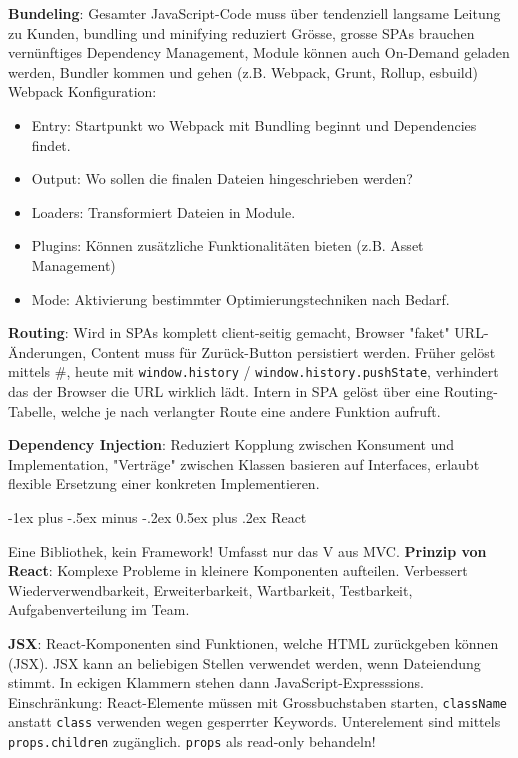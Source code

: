 \documentclass[10pt,landscape]{article}
\makeatletter
\renewcommand{\section}{\@startsection{section}{1}{0mm}%
{-1ex plus -.5ex minus -.2ex}%
{0.5ex plus .2ex}%
{\normalfont\large\bfseries}}
\makeatother
\begin{document}
\begin{multicols}{2}
        \textbf{Bundeling}: Gesamter JavaScript-Code muss über tendenziell langsame Leitung zu Kunden, bundling und minifying reduziert Grösse, grosse SPAs brauchen vernünftiges Dependency Management, Module können auch On-Demand geladen werden, Bundler kommen und gehen (z.B. Webpack, Grunt, Rollup, esbuild)
        Webpack Konfiguration:

        \begin{itemize}
            \item Entry: Startpunkt wo Webpack mit Bundling beginnt und Dependencies findet.
            \item Output: Wo sollen die finalen Dateien hingeschrieben werden?
            \item Loaders: Transformiert Dateien in Module.
            \item Plugins: Können zusätzliche Funktionalitäten bieten (z.B. Asset Management)
            \item Mode: Aktivierung bestimmter Optimierungstechniken nach Bedarf.
        \end{itemize}

        \textbf{Routing}: Wird in SPAs komplett client-seitig gemacht, Browser "faket" URL-Änderungen, Content muss für Zurück-Button persistiert werden.
        Früher gelöst mittels \#, heute mit \lstinline{window.history} / \lstinline{window.history.pushState}, verhindert das der Browser die URL wirklich lädt.
        Intern in SPA gelöst über eine Routing-Tabelle, welche je nach verlangter Route eine andere Funktion aufruft.

        \textbf{Dependency Injection}: Reduziert Kopplung zwischen Konsument und Implementation, "Verträge" zwischen Klassen basieren auf Interfaces, erlaubt flexible Ersetzung einer konkreten Implementieren.


        \section{React}

        Eine Bibliothek, kein Framework!
        Umfasst nur das V aus MVC.
        \textbf{Prinzip von React}: Komplexe Probleme in kleinere Komponenten aufteilen.
        Verbessert Wiederverwendbarkeit, Erweiterbarkeit, Wartbarkeit, Testbarkeit, Aufgabenverteilung im Team.

        \textbf{JSX}: React-Komponenten sind Funktionen, welche HTML zurückgeben können (JSX).
        JSX kann an beliebigen Stellen verwendet werden, wenn Dateiendung stimmt.
        In eckigen Klammern stehen dann JavaScript-Expresssions.
        Einschränkung: React-Elemente müssen mit Grossbuchstaben starten, \lstinline{className} anstatt \lstinline{class} verwenden wegen gesperrter Keywords.
        Unterelement sind mittels \lstinline{props.children} zugänglich.
        \lstinline{props} als read-only behandeln!


\end{multicols}
\end{document}
